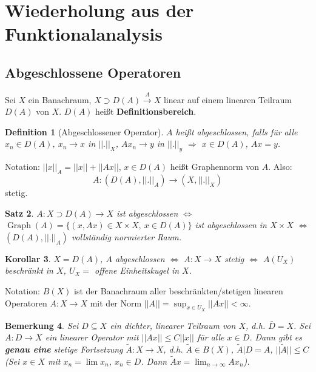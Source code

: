 \documentclass[11pt,a4paper,titlepage, ngerman]{scrartcl}
\newtheorem{Satz}{Satz}[section]
\newtheorem{Definition}[Satz]{Definition}
\newtheorem{Bemerkung}[Satz]{Bemerkung}
\newtheorem{Korollar}[Satz]{Korollar}
\DeclareMathOperator{\Graph}{Graph}
\numberwithin{equation}{section}
\begin{document}
	\newpage	
	\tableofcontents
	\newpage
	
	
	\section{Wiederholung aus der Funktionalanalysis}
	
	\subsection{Abgeschlossene Operatoren}
	
	Sei $X$ ein Banachraum, $X\supset D(A)\overset{A}{\rightarrow} X$ linear auf einem linearen Teilraum $D(A)$ von $X$. $D(A)$ heißt \textbf{Definitionsbereich}. 
	
	\begin{Definition}[Abgeschlossener Operator]
		$A$ heißt abgeschlossen, falls für alle $x_n\in D(A)$, $x_n\rightarrow x$ in $||.||_X$, $Ax_n\rightarrow y$ in $||.||_y$ $\Rightarrow$ $x\in D(A)$, $Ax= y$.
	\end{Definition}
	
	Notation: $||x||_A = ||x||+||Ax||$, $x\in D(A)$ heißt Graphennorm von $A$. Also: 
	$$A:(D(A),||.||_A)\rightarrow (X,||.||_X)$$
	stetig.
	
	\begin{Satz}
		$A:X\supset D(A)\rightarrow X$ ist abgeschlossen $\Leftrightarrow$ $\Graph(A) = \{(x,Ax)\in X\times X,~ x\in D(A) \}$ ist abgeschlossen in $X\times X$ $\Leftrightarrow$ $(D(A),||.||_A)$ vollständig normierter Raum.
	\end{Satz}
	
	\begin{Korollar}
		$X = D(A)$, $A$ abgeschlossen $\Leftrightarrow$ $A:X\rightarrow X$ stetig $\Leftrightarrow$ $A(U_X)$ beschränkt in $X$, $U_X = $ offene Einheitskugel in $X$.
	\end{Korollar}
	
	Notation: $B(X)$ ist der Banachraum aller beschränkten/stetigen linearen Operatoren $A:X\rightarrow X$ mit der Norm $||A|| = \sup_{x\in U_X}||Ax|| <\infty$.
	
	\begin{Bemerkung}
		Sei $D\subseteq X$ ein dichter, linearer Teilraum von $X$, d.h. $\bar{D} = X$. Sei $A:D\rightarrow X$ ein linearer Operator mit $||Ax||\leq C||x||$ für alle $x\in D$. Dann gibt es \textbf{genau eine} stetige Fortsetzung $\tilde{A}: X\rightarrow X$, d.h. $\tilde{A}\in B(X)$, $\tilde{A}|D = A$, $||\tilde{A}||\leq C$ (Sei $x\in X$ mit $x_n=\lim x_n$, $x_n\in D$. Dann $\tilde{A}x=\lim_{n\rightarrow\infty} Ax_n$).
	\end{Bemerkung}
	
\end{document}
